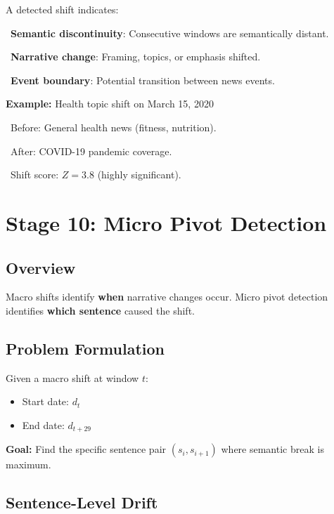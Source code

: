 \documentclass[12pt]{article}
\begin{document}
\begin{tcolorbox}[colback=green!5!white, colframe=green!75!black, title=What Does a Shift Mean?]
A detected shift indicates:

\textbullet\ \textbf{Semantic discontinuity}: Consecutive windows are semantically distant.

\textbullet\ \textbf{Narrative change}: Framing, topics, or emphasis shifted.

\textbullet\ \textbf{Event boundary}: Potential transition between news events.

\textbf{Example:} Health topic shift on March 15, 2020

\textbullet\ Before: General health news (fitness, nutrition).

\textbullet\ After: COVID-19 pandemic coverage.

\textbullet\ Shift score: $Z = 3.8$ (highly significant).
\end{tcolorbox}

\newpage

\section{Stage 10: Micro Pivot Detection}

\subsection{Overview}

Macro shifts identify \textbf{when} narrative changes occur. Micro pivot detection identifies \textbf{which sentence} caused the shift.

\subsection{Problem Formulation}

Given a macro shift at window $t$:
\begin{itemize}
    \item Start date: $d_t$
    \item End date: $d_{t+29}$
\end{itemize}

\textbf{Goal:} Find the specific sentence pair $(s_i, s_{i+1})$ where semantic break is maximum.

\subsection{Sentence-Level Drift}
\end{document}
